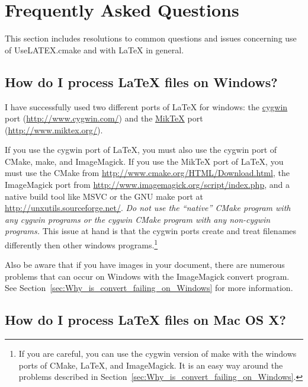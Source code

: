 \documentclass{article}
\newcommand*{\textfile}[1]{\textsf{#1}}
\newcommand*{\UseLATEX}{\textfile{UseLATEX.cmake}\xspace}
\newcommand*{\latex}{\LaTeX\xspace}
\newcommand*{\miktex}{Mik\TeX\xspace}
\begin{document}

  \section{Frequently Asked Questions}
  \label{sec:FrequentlyAskedQuestions}

  This section includes resolutions to common questions and issues
  concerning use of \UseLATEX and with \latex in general.

  \subsection{How do I process \latex files on Windows?}
  \label{sec:How_do_I_process_latex_files_on_Windows}

  I have successfully used two different ports of LaTeX for windows: the
  \href{http://www.cygwin.com/}{cygwin} port
  (\href{http://www.cygwin.com/}{http://www.cygwin.com/}) and the
  \href{http://www.miktex.org/}{\miktex} port
  (\href{http://www.miktex.org/}{http://www.miktex.org/}).

  If you use the cygwin port of \latex, you must also use the cygwin port
  of CMake, make, and ImageMagick. If you use the \miktex port of \latex,
  you must use the CMake from
  \href{http://www.cmake.org/HTML/Download.html}{http://www.cmake.org/HTML/Download.html},
  the ImageMagick port from
  \href{http://www.imagemagick.org/script/index.php}{http://www.imagemagick.org/script/index.php},
  and a native build tool like MSVC or the GNU make port at
  \href{http://unxutils.sourceforge.net/}{http://unxutils.sourceforge.net/}.
  \emph{Do not use the ``native'' CMake program with any cygwin programs or
  the cygwin CMake program with any non-cygwin programs.} This issue at
  hand is that the cygwin ports create and treat filenames differently then
  other windows programs.\footnote{If you are careful, you can use the
  cygwin version of make with the windows ports of CMake, \latex, and
  ImageMagick.  It is an easy way around the problems described in
  Section~\ref{sec:Why_is_convert_failing_on_Windows}.}

  Also be aware that if you have images in your document, there are
  numerous problems that can occur on Windows with the ImageMagick convert
  program. See Section~\ref{sec:Why_is_convert_failing_on_Windows} for more
  information.

  \subsection{How do I process \latex files on Mac OS X?}
  \label{sec:How_do_I_process_latex_files_on_Mac_OS_X}
\end{document}
